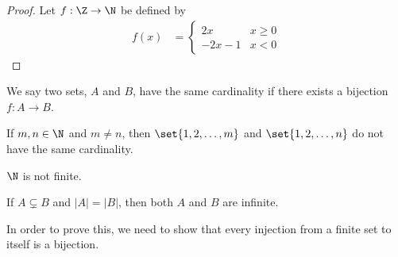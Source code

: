\documentclass[10pt]{mypackage}
\begin{document}
\begin{proof}
  Let $f: \Z\rightarrow \N$ be defined by
  \begin{align*}
    f(x) &= \begin{cases}
      2x & x\geq 0\\
      -2x - 1 & x < 0
    \end{cases}
  \end{align*}
\end{proof}
\begin{definition}[Cardinality]
  We say two sets, $A$ and $B$, have the same cardinality if there exists a bijection $f: A\rightarrow B$.
\end{definition}
\begin{theorem}
  If $m,n\in \N$ and $m\neq n$, then $\set{1,2,\dots,m}$ and $\set{1,2,\dots,n}$ do not have the same cardinality.
\end{theorem}
\begin{theorem}
  $\N$ is not finite.
\end{theorem}
\begin{example}
  If $A\subsetneq B$ and $|A| = |B|$, then both $A$ and $B$ are infinite.\newline

  In order to prove this, we need to show that every injection from a finite set to itself is a bijection.
\end{example}
\end{document}
